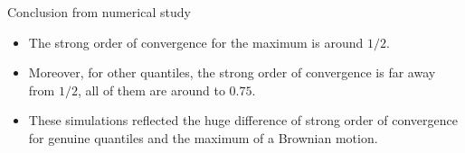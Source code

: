 \documentclass[cjk,10pt]{beamer}
\def\eqlaw{{\stackrel{\text{(law)}}{=}}}
\begin{document}
\begin{frame}{Conclusion from numerical study}
\begin{itemize}
\item
The strong order of convergence for the maximum is around $1/2$.
\item
Moreover, for other quantiles, the strong order of convergence is far away from $1/2$, all of them are around to $0.75$.
\item
These simulations reflected the huge difference of strong order of convergence for genuine quantiles and the maximum of a Brownian motion.
\end{itemize}
\end{frame}
%
\end{document}
